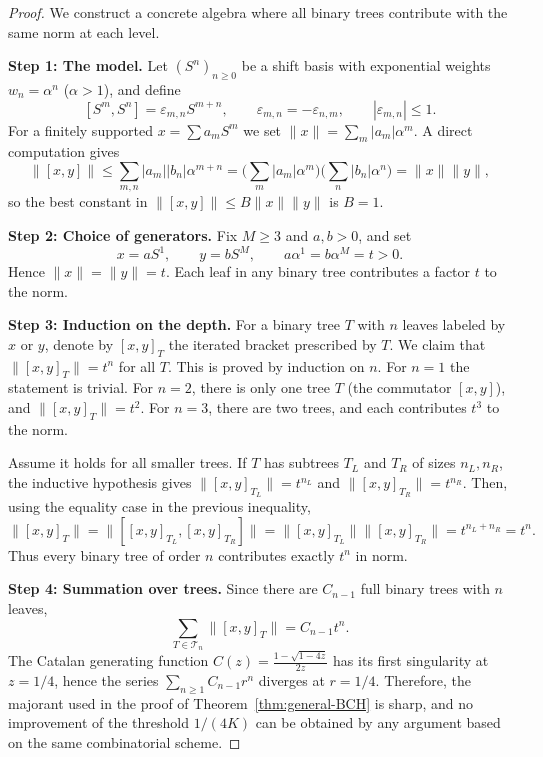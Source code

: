\documentclass[10pt,a4paper]{amsart}
\begin{document}
\begin{proof}
We construct a concrete algebra where all binary trees contribute
with the same norm at each level.

\smallskip
\noindent
\textbf{Step 1: The model.}
Let $(S^n)_{n\ge0}$ be a shift basis with exponential weights
$w_n=\alpha^n$ ($\alpha>1$), and define
\[
[S^m,S^n]=\varepsilon_{m,n}S^{m+n},
\qquad
\varepsilon_{m,n}=-\varepsilon_{n,m},
\qquad
|\varepsilon_{m,n}|\le1.
\]
For a finitely supported $x=\sum a_mS^m$ we set
$\|x\|=\sum_m|a_m|\alpha^m$.
A direct computation gives
\[
\|[x,y]\|
\le\sum_{m,n}|a_m||b_n|\alpha^{m+n}
=\Big(\sum_m|a_m|\alpha^m\Big)\Big(\sum_n|b_n|\alpha^n\Big)
=\|x\|\|y\|,
\]
so the best constant in $\|[x,y]\|\le B\|x\|\|y\|$ is $B=1$.

\smallskip
\noindent
\textbf{Step 2: Choice of generators.}
Fix $M\ge3$ and $a,b>0$, and set
\[
x=aS^{1},\qquad y=bS^{M},
\qquad a\alpha^1=b\alpha^M=t>0.
\]
Hence $\|x\|=\|y\|=t$.
Each leaf in any binary tree contributes a factor $t$ to the norm.

\smallskip
\noindent
\textbf{Step 3: Induction on the depth.}
For a binary tree $T$ with $n$ leaves labeled by $x$ or $y$,
denote by $[x,y]_T$ the iterated bracket prescribed by $T$.
We claim that $\|[x,y]_T\|=t^n$ for all $T$.
This is proved by induction on $n$.
For $n=1$ the statement is trivial.
For $n=2$, there is only one tree $T$ (the commutator $[x, y]$), and $\|[x, y]_T\| = t^2$. For $n=3$, there are two trees, and each contributes $t^3$ to the norm.

Assume it holds for all smaller trees.
If $T$ has subtrees $T_L$ and $T_R$ of sizes $n_L,n_R$,
the inductive hypothesis gives
$\|[x,y]_{T_L}\|=t^{n_L}$ and
$\|[x,y]_{T_R}\|=t^{n_R}$.
Then, using the equality case in the previous inequality,
\[
\|[x,y]_T\|=\|[[x,y]_{T_L},[x,y]_{T_R}]\|
=\|[x,y]_{T_L}\|\|[x,y]_{T_R}\|
=t^{n_L+n_R}=t^n.
\]
Thus every binary tree of order $n$ contributes
exactly $t^n$ in norm.

\smallskip
\noindent
\textbf{Step 4: Summation over trees.}
Since there are $C_{n-1}$ full binary trees with $n$ leaves,
\[
\sum_{T\in\mathcal T_n}\|[x,y]_T\|
=C_{n-1}t^n.
\]
The Catalan generating function
$C(z)=\frac{1-\sqrt{1-4z}}{2z}$
has its first singularity at $z=1/4$,
hence the series $\sum_{n\ge1}C_{n-1}r^n$
diverges at $r=1/4$.
Therefore, the majorant used in the proof of
Theorem~\ref{thm:general-BCH} is sharp,
and no improvement of the threshold $1/(4K)$
can be obtained by any argument based on the same combinatorial scheme.
\end{proof}
\end{document}
